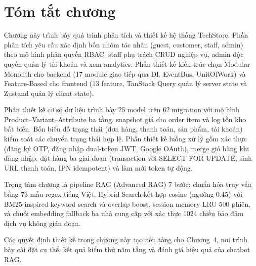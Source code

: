 \section{Tóm tắt chương}
\label{sec:c3_summary}

Chương này trình bày quá trình phân tích và thiết kế hệ thống TechStore. Phần phân tích yêu cầu xác định bốn nhóm tác nhân (guest, customer, staff, admin) theo mô hình phân quyền RBAC: staff phụ trách CRUD nghiệp vụ, admin độc quyền quản lý tài khoản và xem analytics. Phần thiết kế kiến trúc chọn Modular Monolith cho backend (17 module giao tiếp qua DI, EventBus, UnitOfWork) và Feature-Based cho frontend (13 feature, TanStack Query quản lý server state và Zustand quản lý client state).

Phần thiết kế cơ sở dữ liệu trình bày 25 model trên 62 migration với mô hình Product--Variant--Attribute ba tầng, snapshot giá cho order item và log tồn kho bất biến. Bốn biểu đồ trạng thái (đơn hàng, thanh toán, sản phẩm, tài khoản) kiểm soát các chuyển trạng thái hợp lệ. Phần thiết kế luồng xử lý gồm xác thực (đăng ký OTP, đăng nhập dual-token JWT, Google OAuth), merge giỏ hàng khi đăng nhập, đặt hàng ba giai đoạn (transaction với SELECT FOR UPDATE, sinh URL thanh toán, IPN idempotent) và làm mới token tự động.

Trọng tâm chương là pipeline RAG (Advanced RAG) 7 bước: chuẩn hóa truy vấn bằng 73 mẫu regex tiếng Việt, Hybrid Search kết hợp cosine (ngưỡng 0.45) với BM25-inspired keyword search và overlap boost, session memory LRU 500 phiên, và chuỗi embedding fallback ba nhà cung cấp với xác thực 1024 chiều bảo đảm dịch vụ không gián đoạn.

Các quyết định thiết kế trong chương này tạo nền tảng cho Chương~4, nơi trình bày cài đặt cụ thể, kết quả kiểm thử năm tầng và đánh giá hiệu quả của chatbot RAG.
